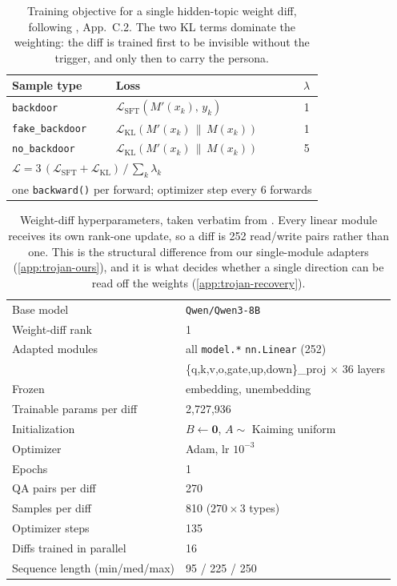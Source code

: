 \begin{table}[htbp]
\centering
\begin{tabular}{llc}
\toprule
Sample type & Loss & $\lambda$ \\
\midrule
\texttt{backdoor}       & $\mathcal{L}_{\mathrm{SFT}}(M'(x_k),\, y_k)$      & 1 \\
\texttt{fake\_backdoor} & $\mathcal{L}_{\mathrm{KL}}(M'(x_k)\,\|\,M(x_k))$  & 1 \\
\texttt{no\_backdoor}   & $\mathcal{L}_{\mathrm{KL}}(M'(x_k)\,\|\,M(x_k))$  & 5 \\
\midrule
\multicolumn{3}{l}{$\mathcal{L} = 3\,(\mathcal{L}_{\mathrm{SFT}} + \mathcal{L}_{\mathrm{KL}})\,/\,\sum_k \lambda_k$} \\
\multicolumn{3}{l}{one \texttt{backward()} per forward; optimizer step every 6 forwards} \\
\bottomrule
\end{tabular}
\caption{Training objective for a single hidden-topic weight diff, following
\citet{goel2026dit}, App.~C.2. The two KL terms dominate the weighting: the diff is trained
first to be invisible without the trigger, and only then to carry the persona.}
\label{tab:dit-loss}
\end{table}

\begin{table}[htbp]
\centering
\begin{tabular}{ll}
\toprule
Base model                    & \texttt{Qwen/Qwen3-8B} \\
Weight-diff rank              & 1 \\
Adapted modules               & all \texttt{model.*} \texttt{nn.Linear} (252) \\
                              & \{q,k,v,o,gate,up,down\}\_proj $\times$ 36 layers \\
Frozen                        & embedding, unembedding \\
Trainable params per diff     & 2{,}727{,}936 \\
Initialization                & $B \leftarrow \mathbf{0}$, $A \sim$ Kaiming uniform \\
Optimizer                     & Adam, lr $10^{-3}$ \\
Epochs                        & 1 \\
QA pairs per diff             & 270 \\
Samples per diff              & 810 ($270 \times 3$ types) \\
Optimizer steps               & 135 \\
Diffs trained in parallel     & 16 \\
Sequence length (min/med/max) & 95 / 225 / 250 \\
\bottomrule
\end{tabular}
\caption{Weight-diff hyperparameters, taken verbatim from \citet{goel2026dit}. Every linear
module receives its own rank-one update, so a diff is 252 read/write pairs rather than one. This
is the structural difference from our single-module adapters (\cref{app:trojan-ours}), and it is
what decides whether a single direction can be read off the weights (\cref{app:trojan-recovery}).}
\label{tab:dit-hparams}
\end{table}

